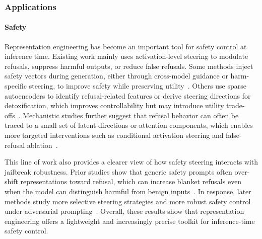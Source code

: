 
\subsubsection{Applications}
\paragraph{Safety}
Representation engineering has become an important tool for safety control at inference time. Existing work mainly uses activation-level steering to modulate refusals, suppress harmful outputs, or reduce false refusals. Some methods inject safety vectors during generation, either through cross-model guidance or harm-specific steering, to improve safety while preserving utility~\citep{Wang2024InferAligner}. Others use sparse autoencoders to identify refusal-related features or derive steering directions for detoxification, which improves controllability but may introduce utility trade-offs~\citep{OBrien2024SAERefusal}. Mechanistic studies further suggest that refusal behavior can often be traced to a small set of latent directions or attention components, which enables more targeted interventions such as conditional activation steering and false-refusal ablation~\citep{Arditi2024SingleDirection, Lee2024CAST, Sheng2025AlphaSteer, zhou2024role}.

This line of work also provides a clearer view of how safety steering interacts with jailbreak robustness. Prior studies show that generic safety prompts often over-shift representations toward refusal, which can increase blanket refusals even when the model can distinguish harmful from benign inputs~\citep{zheng2024prompt}. In response, later methods study more selective steering strategies and more robust safety control under adversarial prompting~\citep{han2025safeswitch, gao-etal-2025-shaping, zhao2025llms}. Overall, these results show that representation engineering offers a lightweight and increasingly precise toolkit for inference-time safety control.


